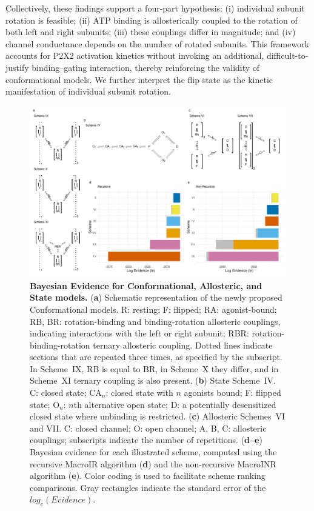 \documentclass[pdflatex,sn-nature]{sn-jnl}%
\theoremstyle{thmstyleone}%
\theoremstyle{thmstyletwo}%
\theoremstyle{thmstylethree}%
\begin{document}
Collectively, these findings support a four-part hypothesis: (i) individual subunit rotation is feasible; (ii) ATP binding is allosterically coupled to the rotation of both left and right subunits; (iii) these couplings differ in magnitude; and (iv) channel conductance depends on the number of rotated subunits. This framework accounts for P2X2 activation kinetics without invoking an additional, difficult-to-justify binding–gating interaction, thereby reinforcing the validity of conformational models. We further interpret the flip state as the kinetic manifestation of individual subunit rotation.
\begin{figure}[t]
	\centering
	\includegraphics[width=\linewidth]{Figure_1.pdf}
	\caption{\textbf{Bayesian Evidence for Conformational, Allosteric, and State models.}  
		(\textbf{a}) Schematic representation of the newly proposed Conformational models. R: resting; F: flipped; RA: agonist-bound; RB, BR: rotation-binding and binding-rotation allosteric couplings, indicating interactions with the left or right subunit; RBR: rotation-binding-rotation ternary allosteric coupling. Dotted lines indicate sections that are repeated three times, as specified by the subscript. In Scheme~IX, RB is equal to BR, in Scheme~X they differ, and in Scheme~XI ternary coupling is also present.  
		(\textbf{b}) State Scheme~IV. C: closed state; CA$_n$: closed state with $n$ agonists bound; F: flipped state; O$_n$: $n$th alternative open state; D: a potentially desensitized closed state where unbinding is restricted.  
		(\textbf{c}) Allosteric Schemes~VI and VII. C: closed channel; O: open channel; A, B, C: allosteric couplings; subscripts indicate the number of repetitions.  
		(\textbf{d--e}) Bayesian evidence for each illustrated scheme, computed using the recursive MacroIR algorithm (\textbf{d}) and the non-recursive MacroINR algorithm (\textbf{e}). Color coding is used to facilitate scheme ranking comparisons. Gray rectangles indicate the standard error of the $log_e(Evidence)$.  
	}
	\label{fig:1}
\end{figure}
\end{document}
